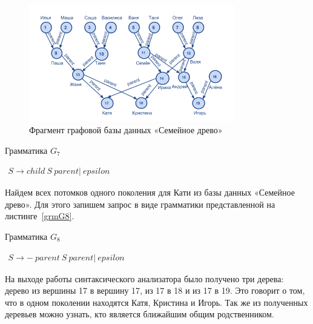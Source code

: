 \begin{figure}
 \centering
 \includegraphics[width=0.8\textwidth]{Smolina/pics/GraphFamily.png}
 \caption{Фрагмент графовой базы данных «Семейное древо»}
 \label{GraphFamily}
\end{figure}

\begin{listing}
\caption{Грамматика $G_7$}
\label{grmG7}
\centering
$\begin{array}{rl}
S \rightarrow child \ S \ parent| \ epsilon
\end{array}$
 \end{listing}

 Найдем всех потомков одного поколения для Кати из базы данных «Семейное древо». Для этого запишем запрос в виде грамматики
представленной на листинге~\ref{grmG8}.

\begin{listing}
\caption{Грамматика $G_8$}
\label{grmG8}
\centering
$\begin{array}{rl}
S \rightarrow - \ parent \ S \ parent| \ epsilon
\end{array}$
 \end{listing}

 На выходе работы синтаксического анализатора было получено три дерева: дерево из вершины 17 в вершину 17, из 17 в 18 и из 17 в 19. Это
говорит о том, что в одном поколении находятся Катя, Кристина и Игорь. Так же из полученных деревьев можно узнать, кто является ближайшим общим родственником.
